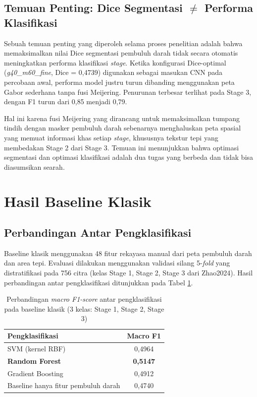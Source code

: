 \subsection{Temuan Penting: Dice Segmentasi $\neq$ Performa Klasifikasi}

Sebuah temuan penting yang diperoleh selama proses penelitian adalah bahwa memaksimalkan nilai
Dice segmentasi pembuluh darah tidak secara otomatis meningkatkan performa klasifikasi
\textit{stage}. Ketika konfigurasi Dice-optimal (\textit{g40\_m60\_fine}, Dice = 0,4739) digunakan
sebagai masukan CNN pada percobaan awal, performa model
justru turun dibanding menggunakan peta Gabor sederhana tanpa fusi Meijering. Penurunan
terbesar terlihat pada Stage 3, dengan F1 turun dari 0,85 menjadi 0,79.

Hal ini karena fusi Meijering yang dirancang untuk memaksimalkan tumpang tindih dengan masker
pembuluh darah sebenarnya menghaluskan peta spasial yang memuat informasi khas setiap
\textit{stage}, khususnya tekstur tepi yang membedakan Stage 2 dari Stage 3. Temuan ini
menunjukkan bahwa optimasi segmentasi dan optimasi klasifikasi adalah dua tugas yang berbeda
dan tidak bisa diasumsikan searah.

\section{Hasil Baseline Klasik}

\subsection{Perbandingan Antar Pengklasifikasi}

Baseline klasik menggunakan 48 fitur rekayasa manual dari peta pembuluh darah dan area tepi.
Evaluasi dilakukan menggunakan validasi silang 5-\textit{fold} yang distratifikasi pada 756
citra (kelas Stage 1, Stage 2, Stage 3 dari Zhao2024). Hasil perbandingan antar pengklasifikasi
ditunjukkan pada Tabel \ref{tab:klasik_perbandingan}.

\begin{table}[H]
\centering
\caption{Perbandingan \textit{macro F1-score} antar pengklasifikasi pada baseline klasik
(3 kelas: Stage 1, Stage 2, Stage 3)}
\label{tab:klasik_perbandingan}
\begin{tabular}{l c}
\toprule
\textbf{Pengklasifikasi} & \textbf{Macro F1} \\
\midrule
SVM (kernel RBF)           & 0,4964 \\
\textbf{Random Forest}     & \textbf{0,5147} \\
Gradient Boosting          & 0,4912 \\
\midrule
Baseline hanya fitur pembuluh darah & 0,4740 \\
\bottomrule
\end{tabular}
\end{table}

